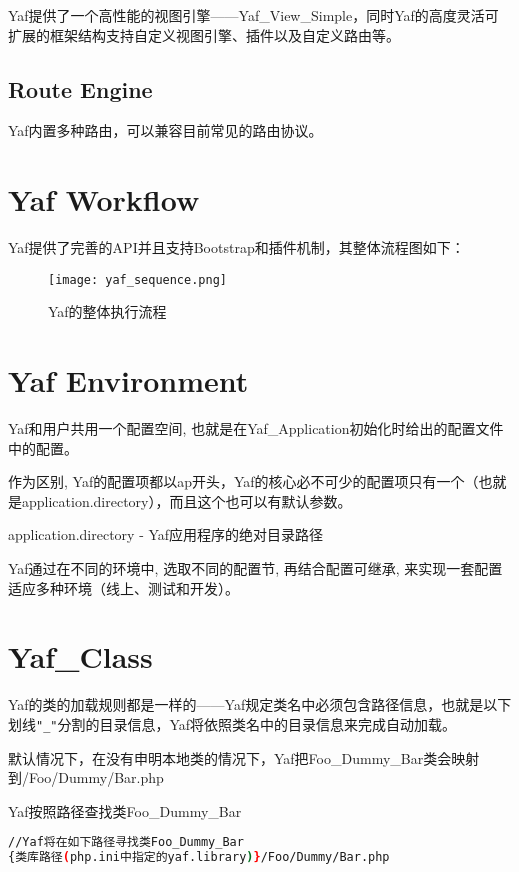 Yaf提供了一个高性能的视图引擎——Yaf\_View\_Simple，同时Yaf的高度灵活可扩展的框架结构支持自定义视图引擎、插件以及自定义路由等。

\section{Route Engine}

Yaf内置多种路由，可以兼容目前常见的路由协议。

\chapter{Yaf Workflow}

Yaf提供了完善的API并且支持Bootstrap和插件机制，其整体流程图如下：

\begin{figure}[htbp]
\centering
\texttt{[image: yaf\_sequence.png]}
\caption{Yaf的整体执行流程}
\end{figure}


\chapter{Yaf Environment}


Yaf和用户共用一个配置空间, 也就是在Yaf\_Application初始化时给出的配置文件中的配置。

作为区别, Yaf的配置项都以ap开头，Yaf的核心必不可少的配置项只有一个（也就是application.directory），而且这个也可以有默认参数。

\begin{compactitem}
\item application.directory - Yaf应用程序的绝对目录路径
\end{compactitem}



Yaf通过在不同的环境中, 选取不同的配置节, 再结合配置可继承, 来实现一套配置适应多种环境（线上、测试和开发）。


\chapter{Yaf\_Class}


Yaf的类的加载规则都是一样的——Yaf规定类名中必须包含路径信息，也就是以下划线\texttt{"\_"}分割的目录信息，Yaf将依照类名中的目录信息来完成自动加载。

默认情况下，在没有申明本地类的情况下，Yaf把Foo\_Dummy\_Bar类会映射到/Foo/Dummy/Bar.php

\begin{example}
Yaf按照路径查找类Foo\_Dummy\_Bar
\begin{lstlisting}[language=bash]
//Yaf将在如下路径寻找类Foo_Dummy_Bar
{类库路径(php.ini中指定的yaf.library)}/Foo/Dummy/Bar.php
\end{lstlisting}
\end{example}


